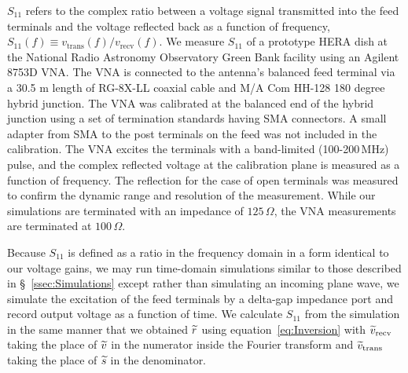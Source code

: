 \documentclass[twocolumn]{emulateapj}
\begin{document}
$S_{11}$ refers to the complex ratio between a voltage signal transmitted into the feed terminals and the voltage reflected back as a function of frequency, $ S_{11}(f) \equiv v_\text{trans}(f)/v_\text{recv}(f) $. We measure $S_{11}$ of a prototype HERA dish at the National Radio Astronomy Observatory Green Bank facility using an Agilent 8753D VNA. The VNA is connected to the antenna's balanced feed terminal via a 30.5 m length of RG-8X-LL coaxial cable and M/A Com HH-128 180 degree hybrid junction.  The VNA was calibrated at the balanced end of the hybrid junction using a set of termination standards having SMA connectors.  A small adapter from SMA to the post terminals on the feed was not included in the calibration.  The VNA excites the terminals with a band-limited (100-200\,MHz) pulse, and the complex reflected voltage at the calibration plane is measured as a function of frequency.  The reflection for the case of open terminals was measured to confirm the dynamic range and resolution of the measurement. While our simulations are terminated with an impedance of $125$\,$\Omega$, the VNA measurements are terminated at $100$\,$\Omega$. 

Because $S_{11}$ is defined as a ratio in the frequency domain in a form identical to our voltage gains, we may run time-domain simulations similar to those described in \S~\ref{ssec:Simulations} except rather than simulating an incoming plane wave, we simulate the excitation of the feed terminals by a delta-gap impedance port and record output voltage as a function of time. We calculate $S_{11}$ from the simulation in the same manner that we obtained ${\widetilde{r}}$ using equation~\ref{eq:Inversion} with ${\widetilde{v}}_\text{recv}$ taking the place of ${\widetilde{v}}$ in the numerator inside the Fourier transform and ${\widetilde{v}}_\text{trans}$ taking the place of ${\widetilde{s}}$ in the denominator. 
\end{document}
